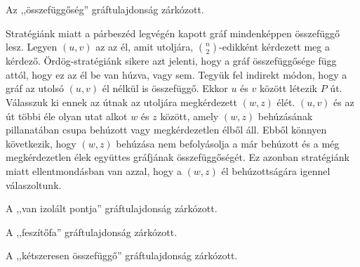 \begin{Exercise}[counter={sorszam}, difficulty=0]
	Az ,,összefüggőség'' gráftulajdonság zárkózott.
	
	
\end{Exercise}

\begin{Answer}
	 Stratégiánk miatt a párbeszéd legvégén kapott gráf mindenképpen összefüggő lesz. Legyen $(u,v)$ az az él, amit utoljára, $\binom{n}{2}$-edikként  kérdezett meg a kérdező. Ördög-stratégiánk sikere azt jelenti, hogy a gráf összefüggősége függ attól, hogy ez az él be van húzva, vagy sem. Tegyük fel indirekt módon, hogy a gráf az utolsó $(u,v)$ él nélkül is összefüggő. Ekkor $u$ és $v$ között létezik $P$ út. Válasszuk ki ennek az útnak az utoljára megkérdezett $(w,z)$ élét. $(u,v)$ és az út többi éle olyan utat alkot $w$ és $z$ között, amely $(w,z)$ behúzásának pillanatában csupa behúzott vagy megkérdezetlen élből áll. Ebből könnyen következik, hogy $(w,z)$ behúzása nem befolyásolja a már behúzott és a még megkérdezetlen élek együttes gráfjának összefüggőségét. Ez azonban stratégiánk miatt ellentmondásban van azzal, hogy a $(w,z)$ él behúzottságára igennel válaszoltunk.
\end{Answer}

\begin{Exercise}[counter={sorszam}, difficulty=2]
	A ,,van izolált pontja'' gráftulajdonság zárkózott.
\end{Exercise}

\begin{Exercise}[counter={sorszam}, difficulty=0]
	A ,,feszítőfa'' gráftulajdonság zárkózott.
\end{Exercise}


\begin{Exercise}[counter={sorszam}, difficulty=0]
	A ,,kétszeresen összefüggő'' gráftulajdonság zárkózott.
\end{Exercise}


